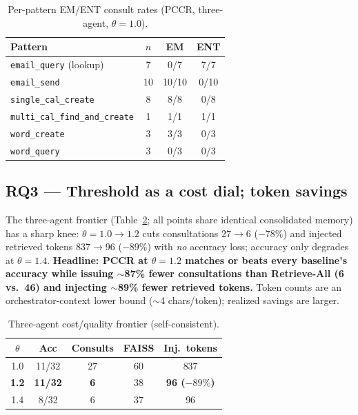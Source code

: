 \documentclass[10pt,twocolumn]{article}
\newcommand{\code}[1]{\texttt{\small #1}}
\begin{document}
\begin{table}[t]
\centering\small
\begin{tabular}{@{}lccc@{}}
\toprule
Pattern & $n$ & EM & ENT \\
\midrule
\code{email\_query} (lookup)        & 7  & 0/7  & 7/7 \\
\code{email\_send}                  & 10 & 10/10& 0/10 \\
\code{single\_cal\_create}          & 8  & 8/8  & 0/8 \\
\code{multi\_cal\_find\_and\_create}& 1  & 1/1  & 1/1 \\
\code{word\_create}                 & 3  & 3/3  & 0/3 \\
\code{word\_query}                  & 3  & 0/3  & 0/3 \\
\bottomrule
\end{tabular}
\caption{Per-pattern EM/ENT consult rates (PCCR, three-agent, $\theta{=}1.0$).}
\label{tab:pattern}
\end{table}

\subsection{RQ3 --- Threshold as a cost dial; token savings}
The three-agent frontier (Table~\ref{tab:frontier}; all points share identical
consolidated memory) has a sharp knee: $\theta{=}1.0{\rightarrow}1.2$ cuts
consultations $27{\rightarrow}6$ ($-78\%$) and injected retrieved tokens
$837{\rightarrow}96$ ($-89\%$) with \emph{no} accuracy loss; accuracy only
degrades at $\theta{=}1.4$. \textbf{Headline: PCCR at $\theta{=}1.2$ matches or
beats every baseline's accuracy while issuing $\sim$87\% fewer consultations than
Retrieve-All (6 vs.\ 46) and injecting $\sim$89\% fewer retrieved tokens.} Token
counts are an orchestrator-context lower bound ($\sim$4 chars/token); realized
savings are larger.

\begin{table}[t]
\centering\small
\begin{tabular}{@{}ccccc@{}}
\toprule
$\theta$ & Acc & Consults & FAISS & Inj.\ tokens \\
\midrule
1.0 & 11/32 & 27 & 60 & 837 \\
\textbf{1.2} & \textbf{11/32} & \textbf{6} & 38 & \textbf{96 ($-89\%$)} \\
1.4 & 8/32 & 6 & 37 & 96 \\
\bottomrule
\end{tabular}
\caption{Three-agent cost/quality frontier (self-consistent).}
\label{tab:frontier}
\end{table}
\end{document}

